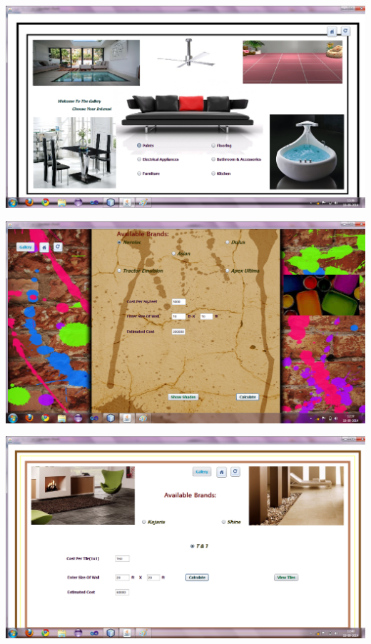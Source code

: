 \documentclass[12pt,a4paper]{report}
\begin{document}
\begin{center}
\includegraphics[scale=0.45]{3.png}
\end{center}
\begin{center}
\includegraphics[scale=0.45]{4.png}
\end{center}
\begin{center}
\includegraphics[scale=0.45]{5.png}
\end{center}
\end{document}
